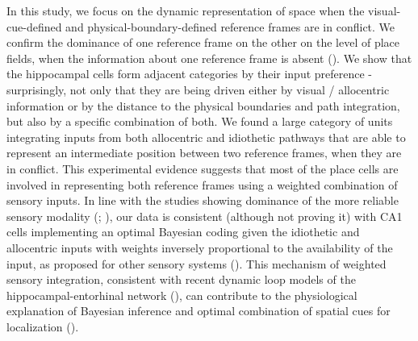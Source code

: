 In this study, we focus on the dynamic representation of space when the visual-cue-defined and physical-boundary-defined reference frames are in conflict. We confirm the dominance of one reference frame on the other on the level of place fields, when the information about one reference frame is absent (\cite{Gothard2001}). We show that the hippocampal cells form adjacent categories by their input preference - surprisingly, not only that they are being driven either by visual / allocentric information or by the distance to the physical boundaries and path integration, but also by a specific combination of both. We found a large category of units integrating inputs from both allocentric and idiothetic pathways that are able to represent an intermediate position between two reference frames, when they are in conflict. This experimental evidence suggests that most of the place cells are involved in representing both reference frames using a weighted combination of sensory inputs. In line with the studies showing dominance of the more reliable sensory modality (\cite{Jeffery1999}; \cite{Gothard2001}), our data is consistent (although not proving it) with CA1 cells implementing an optimal Bayesian coding given the idiothetic and allocentric inputs with weights inversely proportional to the availability of the input, as proposed for other sensory systems (\cite{Jeffery2016}). This mechanism of weighted sensory integration, consistent with recent dynamic loop models of the hippocampal-entorhinal network (\cite{Li2020}), can contribute to the physiological explanation of Bayesian inference and optimal combination of spatial cues for localization  (\cite{Cheng2007}).
